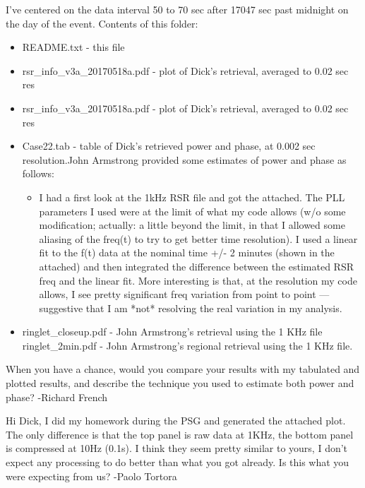 \documentclass[crop=false,class=article,oneside]{standalone}
\begin{document}
I've centered on the data interval 50 to 70 sec after 17047 sec past midnight on the day of the event. Contents of this folder:
\begin{itemize}
    \item README.txt - this file
    \item rsr\_info\_v3a\_20170518a.pdf - plot of Dick's retrieval, averaged to 0.02 sec res
    \item rsr\_info\_v3a\_20170518a.pdf - plot of Dick's retrieval, averaged to 0.02 sec res
    \item Case22.tab - table of Dick's retrieved power and phase, at 0.002 sec resolution.John Armstrong provided some estimates of power and phase as follows:
    \begin{itemize}
        \item I had a first look at the 1kHz RSR file and got the attached. The PLL parameters I used were at the limit of what my code allows (w/o some modification; actually:  a little beyond the limit, in that I allowed
        some aliasing of the freq(t) to try to get better time resolution).  I
        used a linear fit to the f(t) data at the nominal time +/- 2 minutes (shown in the attached) and then integrated the difference between the estimated RSR freq and the linear fit. More interesting is that, at the resolution my code allows, I see pretty significant freq variation from point to point — suggestive that I am *not* resolving the real variation in my analysis.
    \end{itemize}
    \item ringlet\_closeup.pdf - John Armstrong's retrieval using the 1 KHz file ringlet\_2min.pdf - John Armstrong's regional retrieval using the 1 KHz file.
\end{itemize}
When you have a chance, would you compare your results with my tabulated and plotted results, and describe the technique you used to estimate both power and phase? -Richard French
\par\hfill\par
Hi Dick, I did my homework during the PSG and generated the attached plot. The only difference is that the top panel is raw data at 1KHz, the bottom panel is compressed at 10Hz (0.1s). I think they seem pretty similar to yours, I don’t expect any processing to do better than what you got already. Is this what you were expecting from us? -Paolo Tortora
\par\hfill\par
\end{document}
